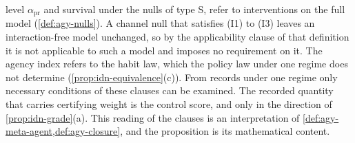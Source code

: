 \begin{remark}
level $\alpha_{\mathrm{pr}}$ and survival under the nulls of type S, refer to interventions on the full model (\cref{def:agy-nulls}). A channel null that satisfies (I1) to (I3) leaves an interaction-free model unchanged, so by the applicability clause of that definition it is not applicable to such a model and imposes no requirement on it. The agency index refers to the habit law, which the policy law under one regime does not determine (\cref{prop:idn-equivalence}(c)). From records under one regime only necessary conditions of these clauses can be examined. The recorded quantity that carries certifying weight is the control score, and only in the direction of \cref{prop:idn-grade}(a). This reading of the clauses is an interpretation of \cref{def:agy-meta-agent,def:agy-closure}, and the proposition is its mathematical content.
\end{remark}

